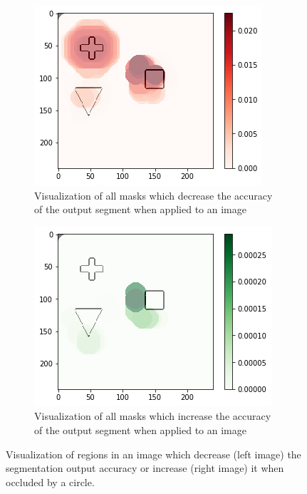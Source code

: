 \begin{figure}[H]
    \centering
    \begin{subfigure}{.48\textwidth}
        \centering
        \includegraphics[width=\linewidth]{chapters/06_hdm/visualization/hdm_worse.png}
        \caption{Visualization of all masks which decrease the accuracy of the output segment when applied to an image}
    \end{subfigure}\hfill%
    \begin{subfigure}{.48\textwidth}
        \centering
        \includegraphics[width=\linewidth]{chapters/06_hdm/visualization/hdm_better.png}
        \caption{Visualization of all masks which increase the accuracy of the output segment when applied to an image}
    \end{subfigure}
    \caption{Visualization of regions in an image which decrease (left image) the segmentation output accuracy or increase (right image) it when occluded by a circle.}
    \label{hdm_visualization_better_worsebetter}
\end{figure}
